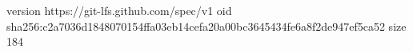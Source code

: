version https://git-lfs.github.com/spec/v1
oid sha256:c2a7036d1848070154ffa03eb14cefa20a00bc3645434fe6a8f2de947ef5ca52
size 184
